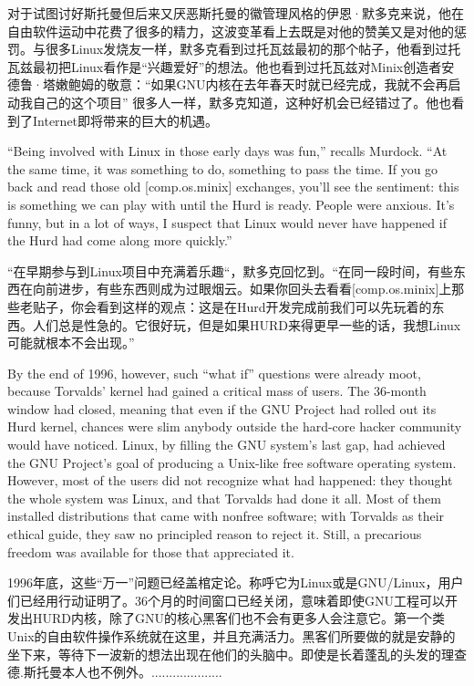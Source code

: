 \ifdefined\chs
对于试图讨好斯托曼但后来又厌恶斯托曼的徽管理风格的伊恩·默多克来说，他在自由软件运动中花费了很多的精力，这波变革看上去既是对他的赞美又是对他的惩罚。与很多Linux发烧友一样，默多克看到过托瓦兹最初的那个帖子，他看到过托瓦兹最初把Linux看作是``兴趣爱好''的想法。他也看到过托瓦兹对Minix创造者安德鲁·塔嫩鲍姆的敬意：``如果GNU内核在去年春天时就已经完成，我就不会再启动我自己的这个项目'' 很多人一样，默多克知道，这种好机会已经错过了。他也看到了Internet即将带来的巨大的机遇。
\fi

\ifdefined\eng
``Being involved with Linux in those early days was fun,'' recalls Murdock. ``At the same time, it was something to do, something to pass the time. If you go back and read those old [comp.os.minix] exchanges, you'll see the sentiment: this is something we can play with until the Hurd is ready. People were anxious. It's funny, but in a lot of ways, I suspect that Linux would never have happened if the Hurd had come along more quickly.''
\fi

\ifdefined\chs
``在早期参与到Linux项目中充满着乐趣``，默多克回忆到。``在同一段时间，有些东西在向前进步，有些东西则成为过眼烟云。如果你回头去看看[comp.os.minix]上那些老贴子，你会看到这样的观点：这是在Hurd开发完成前我们可以先玩着的东西。人们总是性急的。它很好玩，但是如果HURD来得更早一些的话，我想Linux可能就根本不会出现。''
\fi

\ifdefined\eng
By the end of 1996, however, such ``what if'' questions were already moot, because Torvalds' kernel had gained a critical mass of users. The 36-month window had closed, meaning that even if the GNU Project had rolled out its Hurd kernel, chances were slim anybody outside the hard-core hacker community would have noticed.  Linux, by filling the GNU system's last gap, had achieved the GNU Project's goal of producing a Unix-like free software operating system. However, most of the users did not recognize what had happened: they thought the whole system was Linux, and that Torvalds had done it all.   Most of them installed distributions that came with nonfree software; with Torvalds as their ethical guide, they saw no principled reason to reject it.  Still, a precarious freedom was available for those that appreciated it.
\fi

\ifdefined\chs
1996年底，这些``万一''问题已经盖棺定论。称呼它为Linux或是GNU/Linux，用户们已经用行动证明了。36个月的时间窗口已经关闭，意味着即使GNU工程可以开发出HURD内核，除了GNU的核心黑客们也不会有更多人会注意它。第一个类Unix的自由软件操作系统就在这里，并且充满活力。黑客们所要做的就是安静的坐下来，等待下一波新的想法出现在他们的头脑中。即使是长着蓬乱的头发的理查德.斯托曼本人也不例外。....................
\fi

\theendnotes
\setcounter{endnote}{0}
